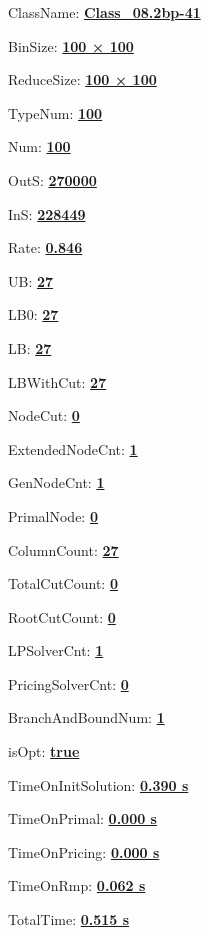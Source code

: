 \documentclass[11pt]{article}
\begin{document}
\pagestyle{empty}


ClassName: \underline{\textbf{Class_08.2bp-41}}
\par
BinSize: \underline{\textbf{100 × 100}}
\par
ReduceSize: \underline{\textbf{100 × 100}}
\par
TypeNum: \underline{\textbf{100}}
\par
Num: \underline{\textbf{100}}
\par
OutS: \underline{\textbf{270000}}
\par
InS: \underline{\textbf{228449}}
\par
Rate: \underline{\textbf{0.846}}
\par
UB: \underline{\textbf{27}}
\par
LB0: \underline{\textbf{27}}
\par
LB: \underline{\textbf{27}}
\par
LBWithCut: \underline{\textbf{27}}
\par
NodeCut: \underline{\textbf{0}}
\par
ExtendedNodeCnt: \underline{\textbf{1}}
\par
GenNodeCnt: \underline{\textbf{1}}
\par
PrimalNode: \underline{\textbf{0}}
\par
ColumnCount: \underline{\textbf{27}}
\par
TotalCutCount: \underline{\textbf{0}}
\par
RootCutCount: \underline{\textbf{0}}
\par
LPSolverCnt: \underline{\textbf{1}}
\par
PricingSolverCnt: \underline{\textbf{0}}
\par
BranchAndBoundNum: \underline{\textbf{1}}
\par
isOpt: \underline{\textbf{true}}
\par
TimeOnInitSolution: \underline{\textbf{0.390 s}}
\par
TimeOnPrimal: \underline{\textbf{0.000 s}}
\par
TimeOnPricing: \underline{\textbf{0.000 s}}
\par
TimeOnRmp: \underline{\textbf{0.062 s}}
\par
TotalTime: \underline{\textbf{0.515 s}}
\par
\newpage


\end{document}
